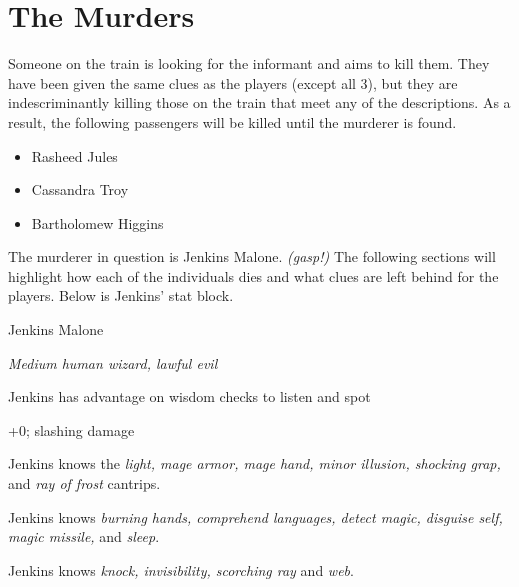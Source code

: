 \documentclass[letterpaper,10pt,twoside,twocolumn,openany]{dndbook}
\begin{document}
\section{The Murders}
Someone on the train is looking for the informant and aims to kill them.  They have been given the same clues as the players (except all 3), but they are indescriminantly killing those on the train that meet any of the descriptions.  As a result, the following passengers will be killed until the murderer is found.

\begin{itemize}
  \item Rasheed Jules
  \item Cassandra Troy
  \item Bartholomew Higgins
\end{itemize}

The murderer in question is Jenkins Malone.  \textit{(gasp!)}  The following sections will highlight how each of the individuals dies and what clues are left behind for the players.  Below is Jenkins' stat block.

\begin{monsterbox}{Jenkins Malone}
  \begin{hangingpar}
    \textit{Medium human wizard, lawful evil}
  \end{hangingpar}
	\dndline%
	\basics[
    armorclass = 12,
    hitpoints  = 26,
    speed      = 30 ft
	]
	\dndline%
	\stats[
    DEX = \stat{14},
    CON = \stat{13},
    INT = \stat{18},
    WIS = \stat{14},
    CHA = \stat{8},
	]
	\dndline%
	\details[%
	  languages = {Common},
    challenge = {900 XP}
	]
	\dndline%
	\begin{monsteraction}
    Jenkins has advantage on wisdom checks to listen and spot
	\end{monsteraction}


  \begin{monsteraction}
    +0;  slashing damage
  \end{monsteraction}

	\begin{monsteraction}[Cantrips]
    Jenkins knows the \textit{light, mage armor, mage hand, minor illusion, shocking grap,} and \textit{ray of frost} cantrips.
	\end{monsteraction}

  \begin{monsteraction}
    Jenkins knows \textit{burning hands, comprehend languages, detect magic, disguise self, magic missile,} and \textit{sleep}.
  \end{monsteraction}

  \begin{monsteraction}
    Jenkins knows \textit{knock, invisibility, scorching ray} and \textit{web}.
  \end{monsteraction}

\end{monsterbox}
\end{document}
